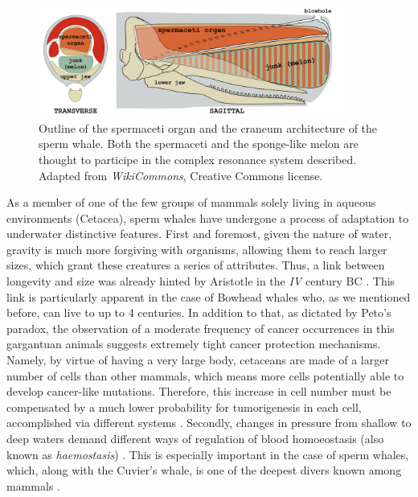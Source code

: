\begin{figure}[t!]
    \begin{center}
        \includegraphics[width=0.9\textwidth]{figures/spermaceti.pdf}
        \caption[Spermaceti organ]{\footnotesize Outline of the spermaceti organ and the craneum architecture of the sperm whale. Both the spermaceti and the sponge-like melon are thought to participe in the complex resonance system described. Adapted from \textsl{WikiCommons}, Creative Commons license.}
        \label{f_spermaceti}
    \end{center}
\end{figure}

As a member of one of the few groups of mammals solely living in aqueous environments (Cetacea), sperm whales have undergone a process of adaptation to underwater distinctive features.
First and foremost, given the nature of water, gravity is much more forgiving with organisms, allowing them to reach larger sizes, which grant these creatures a series of attributes.
Thus, a link between longevity and size was already hinted by Aristotle in the \textsl{IV} century BC \cite{Speakman2005}. 
This link is particularly apparent in the case of Bowhead whales who, as we mentioned before, can live to up to 4 centuries.
In addition to that, as dictated by Peto's paradox, the observation of a moderate frequency of cancer occurrences in this gargantuan animals suggests extremely tight cancer protection mechanisms.
Namely, by virtue of having a very large body, cetaceans are made of a larger number of cells than other mammals, which means more cells potentially able to develop cancer-like mutations.
Therefore, this increase in cell number must be compensated by a much lower probability for tumorigenesis in each cell, accomplished via different systems \cite{Tollis2017a}.
Secondly, changes in pressure from shallow to deep waters demand different ways of regulation of blood homoeostasis (also known as \emph{haemostasis}) \cite{Stewart2009}.
This is especially important in the case of sperm whales, which, along with the Cuvier's whale, is one of the deepest divers known among mammals \cite{Schorr2014}.

